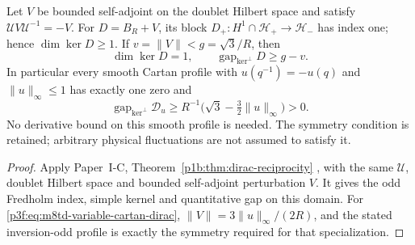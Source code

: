 \documentclass[11pt,a4paper]{article}
\begin{document}
\begin{theorem}
\label{p3f:thm:m8td-protected-zero}
Let $V$ be bounded self-adjoint on the doublet Hilbert space and satisfy
$\mathcal UV\mathcal U^{-1}=-V$. For $D=B_R+V$, its block
$D_+:H^1\cap\mathcal H_+\to\mathcal H_-$ has index one; hence
$\dim\ker D\ge1$. If $v=\|V\|<g=\sqrt3/R$, then
\begin{equation}
 \dim\ker D=1,\qquad\operatorname{gap}_{\ker^\perp}D\ge g-v.
 \label{p3f:eq:m8td-protected-gap}
\end{equation}
In particular every smooth Cartan profile with
$u(q^{-1})=-u(q)$ and $\|u\|_\infty\le1$ has exactly one zero and
\begin{equation}
 \operatorname{gap}_{\ker^\perp}\mathcal D_u
 \ge R^{-1}\bigl(\sqrt3-\tfrac32\|u\|_\infty\bigr)>0.
 \label{p3f:eq:m8td-nonhomogeneous-gap}
\end{equation}
No derivative bound on this smooth profile is needed. The symmetry
condition is retained; arbitrary physical fluctuations are not assumed
to satisfy it.
\end{theorem}
\begin{proof}
Apply Paper~I-C, Theorem~\ref{p1b:thm:dirac-reciprocity}
\cite{Kugelmann2026Paper1C}, with the same \(\mathcal U\), doublet
Hilbert space and bounded self-adjoint perturbation \(V\). It gives the
odd Fredholm index, simple kernel and quantitative gap on this domain.
For \eqref{p3f:eq:m8td-variable-cartan-dirac},
\(\|V\|=3\|u\|_\infty/(2R)\), and the stated inversion-odd profile
is exactly the symmetry required for that specialization.
\end{proof}
\end{document}
